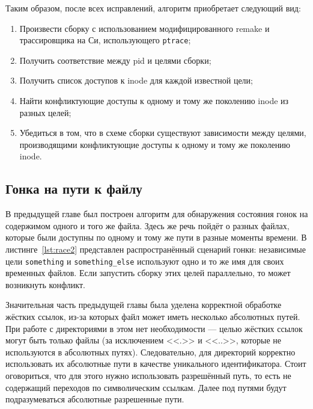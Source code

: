 Таким образом, после всех исправлений, алгоритм приобретает следующий вид:

\begin{enumerate}
	\item Произвести сборку с использованием модифицированного remake и трассировщика на Си, использующего \texttt{ptrace};
	\item Получить соответствие между pid и целями сборки;
	\item Получить список доступов к inode для каждой известной цели;
	\item Найти конфликтующие доступы к одному и тому же поколению inode из разных целей;
	\item Убедиться в том, что в схеме сборки существуют зависимости между целями, производящими конфликтующие доступы к одному и тому же поколению inode.
\end{enumerate}

\subsection{Гонка на пути к файлу}
\label{subsec:path-race}

\begin{figure}[H]

\end{figure}

В предыдущей главе был построен алгоритм для обнаружения состояния гонок на содержимом одного и того же файла. Здесь же речь пойдёт о разных файлах, которые были доступны по одному и тому же пути в разные моменты времени. В листинге~\ref{lst:race2} представлен распространённый сценарий гонки: независимые цели \texttt{something} и \texttt{something\_else} используют одно и то же имя для своих временных файлов. Если запустить сборку этих целей параллельно, то может возникнуть конфликт.

Значительная часть предыдущей главы была уделена корректной обработке жёстких ссылок, из-за которых файл может иметь несколько абсолютных путей. При работе с директориями в этом нет необходимости --- целью жёстких ссылок могут быть только файлы (за исключением <<.>> и <<..>>, которые не используются в абсолютных путях). Следовательно, для директорий корректно использовать их абсолютные пути в качестве уникального идентификатора. Стоит оговориться, что для этого нужно использовать разрешённый путь, то есть не содержащий переходов по символическим ссылкам. Далее под путями будут подразумеваться абсолютные разрешенные пути.

